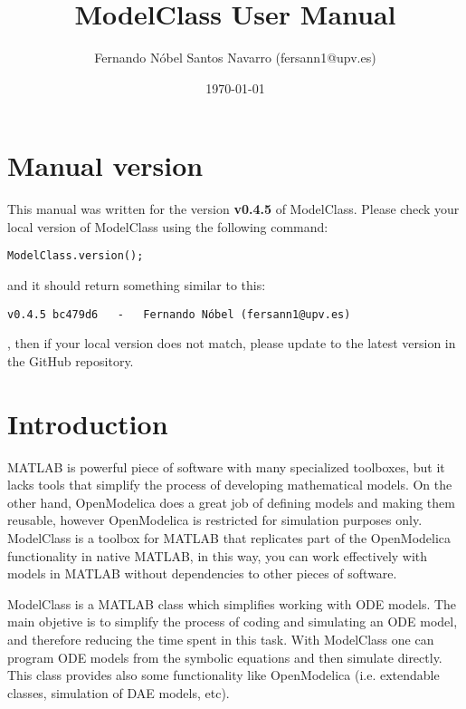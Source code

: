 \documentclass[11pt]{article}
\title{ModelClass User Manual}
\author{Fernando Nóbel Santos Navarro (fersann1@upv.es)}
\date{\today}
\begin{document}
\maketitle

\tableofcontents

\newpage 

\setlength{\parskip}{0.5em}

\section{Manual version}

This manual was written for the version \textbf{ 
v0.4.5
} of ModelClass. Please check your local version of ModelClass using the following command:

\begin{lstlisting}
ModelClass.version();
\end{lstlisting}

and it should return something similar to this:

\begin{lstlisting}
v0.4.5 bc479d6   -   Fernando Nóbel (fersann1@upv.es)\end{lstlisting}
, then if your local version does not match, please update to the latest version in the GitHub repository.

\section{Introduction}

MATLAB is powerful piece of software with many specialized toolboxes, but it lacks tools that simplify the process of developing mathematical models.
On the other hand, OpenModelica does a great job of defining models and making them reusable, however OpenModelica is restricted for simulation purposes only.
ModelClass is a toolbox for MATLAB that replicates part of the OpenModelica functionality in native MATLAB, in this way, you can work effectively with models in MATLAB without dependencies to other pieces of software.

ModelClass is a MATLAB class which simplifies working with ODE models. The main objetive is to simplify the process of coding and simulating an ODE model, and therefore reducing the time spent in this task. With ModelClass one can program ODE models from the symbolic equations and then simulate directly. This class provides also some functionality like OpenModelica (i.e. extendable classes, simulation of DAE models, etc).
\end{document}
